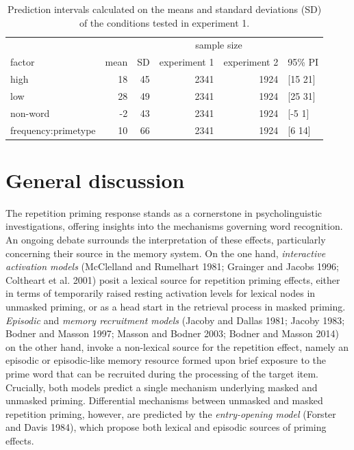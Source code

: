 \documentclass[
]{interact}
\begin{document}
\begin{longtable}{lrrrrl}

\caption{\label{tbl-pis}Prediction intervals calculated on the means and
standard deviations (SD) of the conditions tested in experiment 1.}

\tabularnewline

\toprule
 &  &  & \multicolumn{2}{c}{sample size} &  \\ 
\cmidrule(lr){4-5}
factor & mean & SD & experiment 1 & experiment 2 & 95\% PI \\ 
\midrule\addlinespace[2.5pt]
high & 18 & 45 & 2341 & 1924 & [15 21] \\ 
low & 28 & 49 & 2341 & 1924 & [25 31] \\ 
non-word & -2 & 43 & 2341 & 1924 & [-5 1] \\ 
frequency:primetype & 10 & 66 & 2341 & 1924 & [6 14] \\ 
\bottomrule

\end{longtable}

\section{General discussion}\label{sec-discussion}

The repetition priming response stands as a cornerstone in
psycholinguistic investigations, offering insights into the mechanisms
governing word recognition. An ongoing debate surrounds the
interpretation of these effects, particularly concerning their source in
the memory system. On the one hand, \emph{interactive activation models}
(McClelland and Rumelhart 1981; Grainger and Jacobs 1996; Coltheart et
al. 2001) posit a lexical source for repetition priming effects, either
in terms of temporarily raised resting activation levels for lexical
nodes in unmasked priming, or as a head start in the retrieval process
in masked priming. \emph{Episodic} and \emph{memory recruitment models}
(Jacoby and Dallas 1981; Jacoby 1983; Bodner and Masson 1997; Masson and
Bodner 2003; Bodner and Masson 2014) on the other hand, invoke a
non-lexical source for the repetition effect, namely an episodic or
episodic-like memory resource formed upon brief exposure to the prime
word that can be recruited during the processing of the target item.
Crucially, both models predict a single mechanism underlying masked and
unmasked priming. Differential mechanisms between unmasked and masked
repetition priming, however, are predicted by the \emph{entry-opening
model} (Forster and Davis 1984), which propose both lexical and episodic
sources of priming effects.
\end{document}
